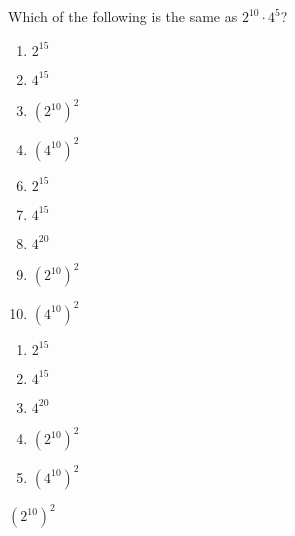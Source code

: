 

 Which of the following is the same as $2^{10}\cdot 4^{5}$?  



\ifsat
	\begin{enumerate}[label=\Alph*)]
		\item   $2^{15}$
		\item  $4^{15}$
		\item  $\left(2^{10}\right)^{2}$%
		\item  $\left(4^{10}\right)^{2}$
	\end{enumerate}
\else
\fi

\ifacteven
	\begin{enumerate}[label=\textbf{\Alph*.},itemsep=\fill,align=left]
		\setcounter{enumii}{5}
		\item   $2^{15}$
		\item  $4^{15}$
		\item  $4^{20}$
		\addtocounter{enumii}{1}
		\item  $\left(2^{10}\right)^{2}$%
		\item  $\left(4^{10}\right)^{2}$
	\end{enumerate}
\else
\fi

\ifactodd
	\begin{enumerate}[label=\textbf{\Alph*.},itemsep=\fill,align=left]
		\item   $2^{15}$
		\item  $4^{15}$
		\item  $4^{20}$
		\item  $\left(2^{10}\right)^{2}$%
		\item  $\left(4^{10}\right)^{2}$
	\end{enumerate}
\else
\fi

\ifgridin
  $\left(2^{10}\right)^{2}$%
		
\else
\fi

